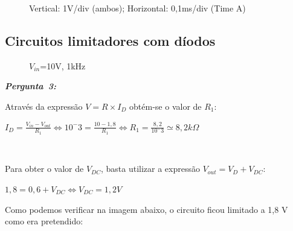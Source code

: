 \documentclass[pdftex,12pt,a4paper]{report}
\begin{document}
\begin{figure}[h]
\centerline{}
\caption{Vertical: 1V/div (ambos); Horizontal: 0,1ms/div (Time A)}\label{grafico_12_02_osciloscopio}
\end{figure}

\newpage
\subsection{Circuitos limitadores com díodos}
\begin{figure}[h]
\centerline{}
\caption{$V_{in}$=10V, 1kHz}\label{circuito13}
\end{figure}

\hbox{\emph{\textbf{Pergunta 3:}\newline}}


Através da expressão $V = R \times I_D$ obtém-se o valor de $R_1$:\newline
\centerline{$I_D = \frac{V_{in} - V_{out}}{R_1} \Leftrightarrow 10^-3 = \frac{10-1,8}{R_1} \Leftrightarrow R_1 = \frac{8,2}{10^-3} \simeq 8,2k\Omega$}\\
\vspace{0.1cm}

Para obter o valor de $V_{DC}$, basta utilizar a expressão $V_{out} = V_D + V_{DC}$:
\centerline{$ 1,8 = 0,6 + V_{DC} \Leftrightarrow V_{DC} = 1,2V$}
\vspace{0.2cm}

Como podemos verificar na imagem abaixo, o circuito ficou limitado a 1,8 V como era pretendido:
\end{document}

